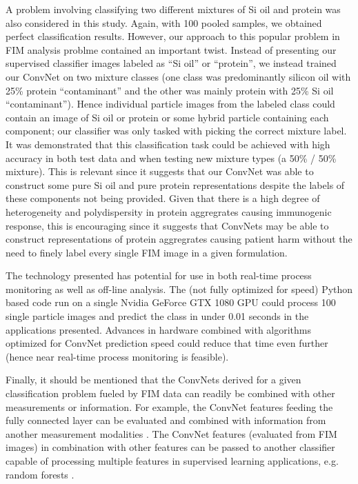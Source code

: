\documentclass[%
reprint,
superscriptaddress,
 aps,
 pre,
]{revtex4-1}
\begin{document}
A problem involving classifying two different mixtures of Si oil and protein was also considered in this study.  Again, with 100 pooled samples, we obtained perfect classification results.  However, our approach to this popular problem in FIM analysis problme \cite{Zolls2013,Saggu2017} contained an important twist.  Instead of presenting our supervised classifier images labeled as ``Si oil'' or ``protein'', we instead trained our ConvNet on two mixture classes (one class was predominantly silicon oil with 25\%  protein ``contaminant'' and the other was mainly protein with 25\% Si oil ``contaminant'').  Hence individual particle images from the labeled class could contain an image of Si oil or protein or some hybrid particle containing each component;  our classifier was only tasked with picking the correct mixture label.  It was demonstrated that this classification task could be achieved with high accuracy in both test data and when testing new mixture types (a 50\% / 50\% mixture).  This is relevant since  it suggests that our ConvNet  was able to construct some pure Si oil and pure protein representations despite the labels of these components not being provided.  Given that there is a high degree of heterogeneity and polydispersity in protein aggregrates causing immunogenic response, this is encouraging since it suggests that ConvNets may be able to construct representations of protein aggregrates causing patient harm without the need to finely label every single FIM image in a given formulation. 


The technology presented has potential for use in both real-time process monitoring as well as off-line analysis.  The (not fully optimized for speed) Python based  code run on a single Nvidia GeForce GTX 1080 GPU could process  100 single particle images and predict the class in under 0.01 seconds in the applications presented.  Advances in hardware combined with algorithms optimized for ConvNet prediction speed could reduce that time even further (hence near real-time process monitoring is feasible). 

Finally, it should be mentioned that the ConvNets derived for a given classification problem fueled by FIM data can readily be combined with other measurements or information.  For example, the ConvNet features feeding the fully connected layer can be evaluated and combined with information from another measurement modalities 
\cite{RiosQuiroz2016}.  The ConvNet features (evaluated from FIM images) in combination with other features can be passed 
 to another classifier capable of processing multiple features in supervised learning applications, e.g. random forests \cite{Breiman2001RF,Saggu2017}.  
\end{document}
